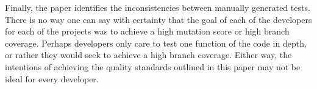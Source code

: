 Finally, the paper identifies the inconsistencies between manually generated tests. There is no way one can say with certainty that the goal of each of the developers for each of the projects was to achieve a high mutation score or high branch coverage. Perhaps developers only care to test one function of the code in depth, or rather they would seek to achieve a high branch coverage. Either way, the intentions of achieving the quality standards outlined in this paper may not be ideal for every developer. 




